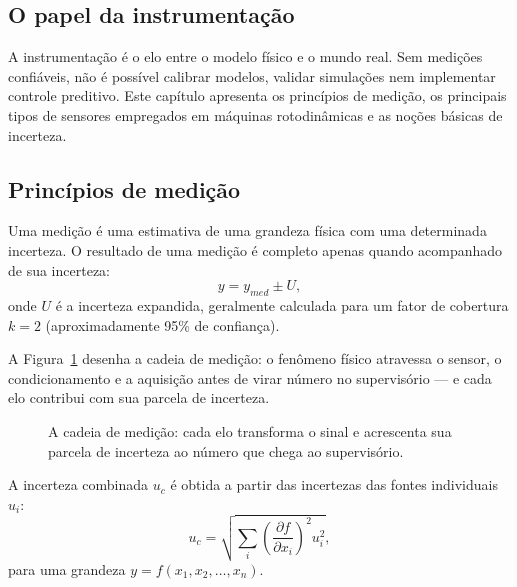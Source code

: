 \documentclass[12pt,a4paper]{article}
\numberwithin{equation}{section}
\numberwithin{table}{section}
\numberwithin{figure}{section}
\begin{document}
\subsection{O papel da instrumentação}

A instrumentação é o elo entre o modelo físico e o mundo real. Sem medições
confiáveis, não é possível calibrar modelos, validar simulações nem implementar
controle preditivo. Este capítulo apresenta os princípios de medição, os
principais tipos de sensores empregados em máquinas rotodinâmicas e as
noções básicas de incerteza.

\subsection{Princípios de medição}

Uma medição é uma estimativa de uma grandeza física com uma determinada
incerteza. O resultado de uma medição é completo apenas quando acompanhado de
sua incerteza:
\begin{equation}\label{eq:v1-c9-1}
y = y_{med} \pm U,
\end{equation}
onde $U$ é a incerteza expandida, geralmente calculada para um fator de
cobertura $k=2$ (aproximadamente 95\% de confiança).

A Figura~\ref{fig:v1-c9-1} desenha a cadeia de medição: o fenômeno físico
atravessa o sensor, o condicionamento e a aquisição antes de virar número no
supervisório --- e cada elo contribui com sua parcela de incerteza.

\begin{figure}[H]
\centering
{}
\caption[A cadeia de medição, do fenômeno ao número.]{A cadeia de medição:
cada elo transforma o sinal e acrescenta sua parcela de incerteza ao número
que chega ao supervisório.}
\label{fig:v1-c9-1}
\end{figure}


A incerteza combinada $u_c$ é obtida a partir das incertezas das fontes
individuais $u_i$:
\begin{equation}\label{eq:v1-c9-2}
u_c = \sqrt{\sum_i \left(\frac{\partial f}{\partial x_i}\right)^2 u_i^2},
\end{equation}
para uma grandeza $y = f(x_1, x_2, \ldots, x_n)$.
\end{document}
